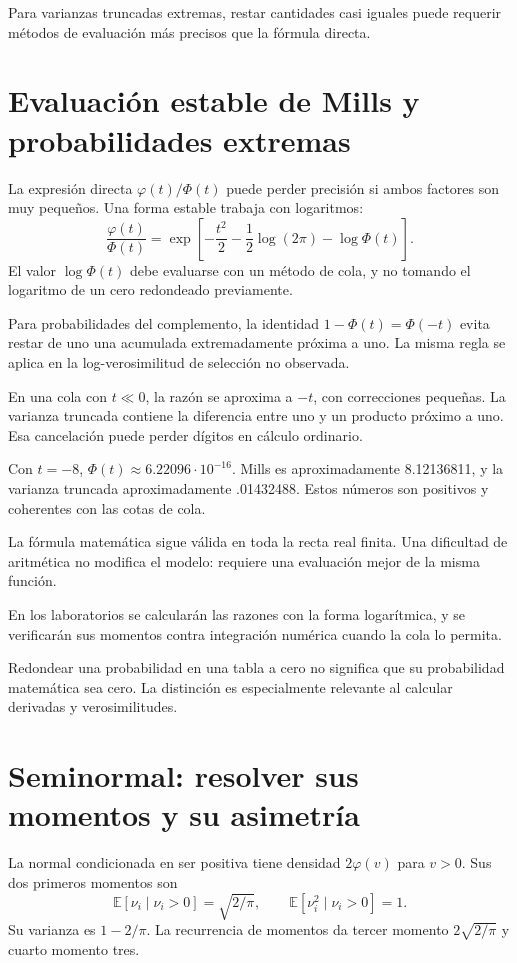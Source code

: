 \documentclass[11pt,a4paper]{article}
\newcommand{\E}{\mathbb E}
\begin{document}
Para varianzas truncadas extremas,
restar cantidades casi iguales
puede requerir métodos de evaluación
más precisos que la fórmula directa.

\clearpage
\section{Evaluación estable de Mills y probabilidades extremas}\label{unidad74}
La expresión directa
\(\varphi(t)/\Phi(t)\) puede perder precisión
si ambos factores son muy pequeños.
Una forma estable trabaja con logaritmos:
\[
\frac{\varphi(t)}{\Phi(t)}
=\exp\left[-\frac{t^2}{2}
-\frac12\log(2\pi)-\log\Phi(t)\right].
\]
El valor \(\log\Phi(t)\) debe
evaluarse con un método de cola,
y no tomando el logaritmo
de un cero redondeado previamente.

Para probabilidades del complemento,
la identidad \(1-\Phi(t)=\Phi(-t)\)
evita restar de uno una
acumulada extremadamente próxima a uno.
La misma regla se aplica
en la log-verosimilitud de
selección no observada.

En una cola con \(t\ll0\),
la razón se aproxima a \(-t\),
con correcciones pequeñas.
La varianza truncada contiene
la diferencia entre uno
y un producto próximo a uno.
Esa cancelación puede perder
dígitos en cálculo ordinario.

\begin{ejemplo}
Con \(t=-8\),
\(\Phi(t)\approx6.22096\cdot10^{-16}\).
Mills es aproximadamente 8.12136811,
y la varianza truncada aproximadamente .01432488.
Estos números son positivos y
coherentes con las cotas de cola.
\end{ejemplo}
La fórmula matemática sigue válida
en toda la recta real finita.
Una dificultad de aritmética
no modifica el modelo:
requiere una evaluación mejor
de la misma función.

En los laboratorios se calcularán
las razones con la forma logarítmica,
y se verificarán sus momentos
contra integración numérica
cuando la cola lo permita.

Redondear una probabilidad en
una tabla a cero no significa
que su probabilidad matemática
sea cero. La distinción es
especialmente relevante al calcular
derivadas y verosimilitudes.

\clearpage
\section{Seminormal: resolver sus momentos y su asimetría}\label{unidad75}
La normal condicionada en ser positiva
tiene densidad \(2\varphi(v)\)
para \(v>0\).
Sus dos primeros momentos son
\[
\E[\nu_i\mid\nu_i>0]=\sqrt{2/\pi},
\qquad
\E[\nu_i^2\mid\nu_i>0]=1.
\]
Su varianza es
\(1-2/\pi\).
La recurrencia de momentos da
tercer momento \(2\sqrt{2/\pi}\)
y cuarto momento tres.
\end{document}
